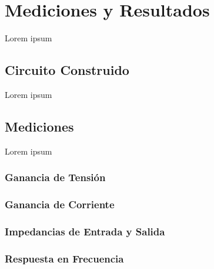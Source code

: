 \chapter{Mediciones y Resultados}
Lorem ipsum
\section{Circuito Construido}
Lorem ipsum
\section{Mediciones}
Lorem ipsum

\subsection{Ganancia de Tensión}
\subsection{Ganancia de Corriente}
\subsection{Impedancias de Entrada y Salida}
\subsection{Respuesta en Frecuencia}
